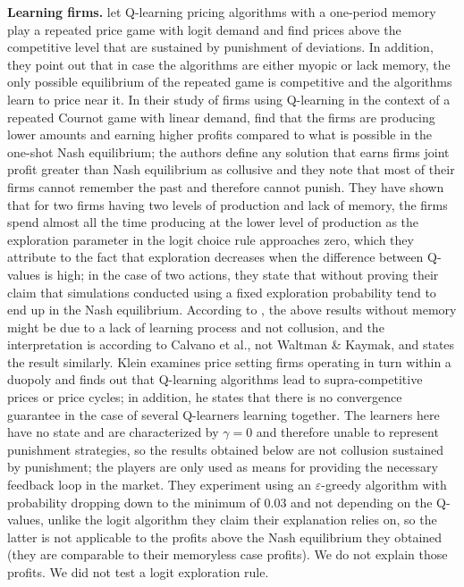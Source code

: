 \documentclass[11pt]{article}
\begin{document}
\textbf{Learning firms.} \citet{calvano2020} let Q-learning pricing algorithms with a one-period memory play a repeated price game with logit demand and find prices above the competitive level that are sustained by punishment of deviations. In addition, they point out that in case the algorithms are either myopic or lack memory, the only possible equilibrium of the repeated game is competitive and the algorithms learn to price near it. In their study of firms using Q-learning in the context of a repeated Cournot game with linear demand, \citet{waltman2008} find that the firms are producing lower amounts and earning higher profits compared to what is possible in the one-shot Nash equilibrium; the authors define any solution that earns firms joint profit greater than Nash equilibrium as collusive and they note that most of their firms cannot remember the past and therefore cannot punish. They have shown that for two firms having two levels of production and lack of memory, the firms spend almost all the time producing at the lower level of production as the exploration parameter in the logit choice rule approaches zero, which they attribute to the fact that exploration decreases when the difference between Q-values is high; in the case of two actions, they state that without proving their claim that simulations conducted using a fixed exploration probability tend to end up in the Nash equilibrium. According to \citet{calvano2020}, the above results without memory might be due to a lack of learning process and not collusion, and the interpretation is according to Calvano et al., not Waltman \& Kaymak, and \citet{klein2021} states the result similarly. Klein examines price setting firms operating in turn within a duopoly and finds out that Q-learning algorithms lead to supra-competitive prices or price cycles; in addition, he states that there is no convergence guarantee in the case of several Q-learners learning together. The learners here have no state and are characterized by $\gamma=0$ and therefore unable to represent punishment strategies, so the results obtained below are not collusion sustained by punishment; the players are only used as means for providing the necessary feedback loop in the market. They experiment using an $\varepsilon$-greedy algorithm with probability dropping down to the minimum of $0.03$ and not depending on the Q-values, unlike the logit algorithm they claim their explanation relies on, so the latter is not applicable to the profits above the Nash equilibrium they obtained (they are comparable to their memoryless case profits). We do not explain those profits. We did not test a logit exploration rule.
\end{document}
